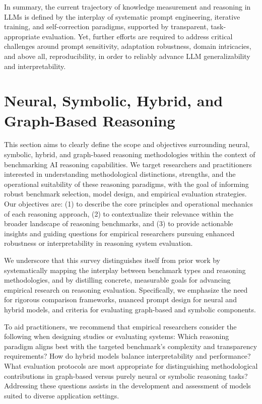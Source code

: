 \documentclass[sigconf]{acmart}
\begin{document}
In summary, the current trajectory of knowledge measurement and reasoning in LLMs is defined by the interplay of systematic prompt engineering, iterative training, and self-correction paradigms, supported by transparent, task-appropriate evaluation. Yet, further efforts are required to address critical challenges around prompt sensitivity, adaptation robustness, domain intricacies, and above all, reproducibility, in order to reliably advance LLM generalizability and interpretability.

\section{Neural, Symbolic, Hybrid, and Graph-Based Reasoning}

This section aims to clearly define the scope and objectives surrounding neural, symbolic, hybrid, and graph-based reasoning methodologies within the context of benchmarking AI reasoning capabilities. We target researchers and practitioners interested in understanding methodological distinctions, strengths, and the operational suitability of these reasoning paradigms, with the goal of informing robust benchmark selection, model design, and empirical evaluation strategies. Our objectives are: (1) to describe the core principles and operational mechanics of each reasoning approach, (2) to contextualize their relevance within the broader landscape of reasoning benchmarks, and (3) to provide actionable insights and guiding questions for empirical researchers pursuing enhanced robustness or interpretability in reasoning system evaluation.

We underscore that this survey distinguishes itself from prior work by systematically mapping the interplay between benchmark types and reasoning methodologies, and by distilling concrete, measurable goals for advancing empirical research on reasoning evaluation. Specifically, we emphasize the need for rigorous comparison frameworks, nuanced prompt design for neural and hybrid models, and criteria for evaluating graph-based and symbolic components.

To aid practitioners, we recommend that empirical researchers consider the following when designing studies or evaluating systems: Which reasoning paradigm aligns best with the targeted benchmark's complexity and transparency requirements? How do hybrid models balance interpretability and performance? What evaluation protocols are most appropriate for distinguishing methodological contributions in graph-based versus purely neural or symbolic reasoning tasks? Addressing these questions assists in the development and assessment of models suited to diverse application settings.
\end{document}
